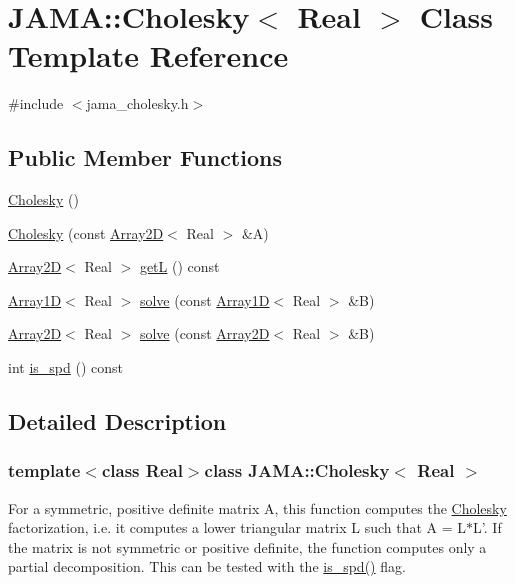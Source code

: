 \hypertarget{classJAMA_1_1Cholesky}{\section{J\-A\-M\-A\-:\-:Cholesky$<$ Real $>$ Class Template Reference}
\label{classJAMA_1_1Cholesky}
}


{\ttfamily \#include $<$jama\-\_\-cholesky.\-h$>$}

\subsection*{Public Member Functions}
\begin{DoxyCompactItemize}
\item 
\hyperlink{classJAMA_1_1Cholesky_a0af68661b83b7a6be938b42e2b2591b6}{Cholesky} ()
\item 
\hyperlink{classJAMA_1_1Cholesky_af859c41220c4313470d28fa13706ff63}{Cholesky} (const \hyperlink{classTNT_1_1Array2D}{Array2\-D}$<$ Real $>$ \&A)
\item 
\hyperlink{classTNT_1_1Array2D}{Array2\-D}$<$ Real $>$ \hyperlink{classJAMA_1_1Cholesky_a274b8bbd584bcf84ec860a24aa2b8b2a}{get\-L} () const 
\item 
\hyperlink{classTNT_1_1Array1D}{Array1\-D}$<$ Real $>$ \hyperlink{classJAMA_1_1Cholesky_af0f727e2b0e989f7606cdb49de69f119}{solve} (const \hyperlink{classTNT_1_1Array1D}{Array1\-D}$<$ Real $>$ \&B)
\item 
\hyperlink{classTNT_1_1Array2D}{Array2\-D}$<$ Real $>$ \hyperlink{classJAMA_1_1Cholesky_a8a3c0067663955146713a9aa3b8a3413}{solve} (const \hyperlink{classTNT_1_1Array2D}{Array2\-D}$<$ Real $>$ \&B)
\item 
int \hyperlink{classJAMA_1_1Cholesky_ab8ac7d6f0c9ef4e0fb74b001fe03ff90}{is\-\_\-spd} () const 
\end{DoxyCompactItemize}


\subsection{Detailed Description}
\subsubsection*{template$<$class Real$>$class J\-A\-M\-A\-::\-Cholesky$<$ Real $>$}

For a symmetric, positive definite matrix A, this function computes the \hyperlink{classJAMA_1_1Cholesky}{Cholesky} factorization, i.\-e. it computes a lower triangular matrix L such that A = L$\ast$\-L'. If the matrix is not symmetric or positive definite, the function computes only a partial decomposition. This can be tested with the \hyperlink{classJAMA_1_1Cholesky_ab8ac7d6f0c9ef4e0fb74b001fe03ff90}{is\-\_\-spd()} flag.

